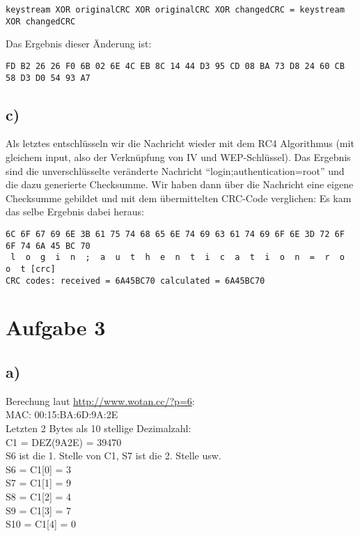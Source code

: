 \documentclass[10pt,a4paper]{article}
\begin{document}
\begin{verbatim}
keystream XOR originalCRC XOR originalCRC XOR changedCRC = keystream XOR changedCRC
\end{verbatim}

Das Ergebnis dieser Änderung ist:

\begin{verbatim}
FD B2 26 26 F0 6B 02 6E 4C EB 8C 14 44 D3 95 CD 08 BA 73 D8 24 60 CB 58 D3 D0 54 93 A7
\end{verbatim}

\subsection*{c)}

Als letztes entschlüsseln wir die Nachricht wieder mit dem RC4 Algorithmus (mit gleichem input, also der Verknüpfung von IV und WEP-Schlüssel). Das Ergebnis sind die unverschlüsselte veränderte Nachricht "`login;authentication=root"' und die dazu generierte Checksumme. Wir haben dann über die Nachricht eine eigene Checksumme gebildet und mit dem übermittelten CRC-Code verglichen: Es kam das selbe Ergebnis dabei heraus:

\begin{verbatim}
6C 6F 67 69 6E 3B 61 75 74 68 65 6E 74 69 63 61 74 69 6F 6E 3D 72 6F 6F 74 6A 45 BC 70 
 l  o  g  i  n  ;  a  u  t  h  e  n  t  i  c  a  t  i  o  n  =  r  o  o  t [crc]
CRC codes: received = 6A45BC70 calculated = 6A45BC70
\end{verbatim}



\section{Aufgabe 3}

\subsection*{a)}
Berechung laut \href{http://www.wotan.cc/?p=6}{http://www.wotan.cc/?p=6}:\\
MAC: 00:15:BA:6D:9A:2E\\
Letzten 2 Bytes als 10 stellige Dezimalzahl:\\
C1 = DEZ(9A2E) = 39470\\
 
S6 ist die 1. Stelle von C1, S7 ist die 2. Stelle usw.\\
S6 = C1[0] = 3 \\
S7 = C1[1] = 9 \\
S8 = C1[2] = 4 \\
S9 = C1[3] = 7 \\
S10 = C1[4] = 0 \\
 
\end{document}
